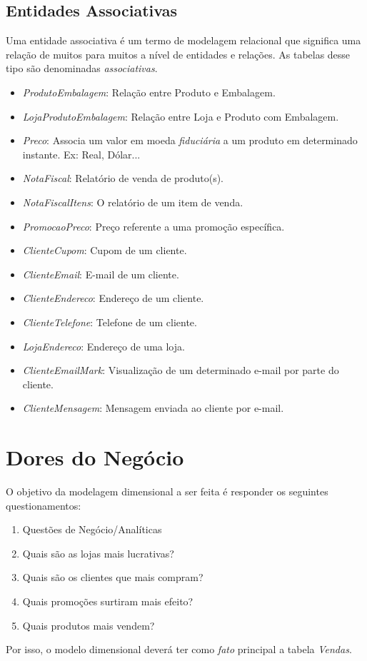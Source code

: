 \subsection{Entidades Associativas}

Uma entidade associativa é um termo de modelagem relacional que significa uma relação de muitos para muitos a nível de entidades e relações. As tabelas desse tipo são denominadas \emph{associativas}.

\begin{itemize}
\item \emph{ProdutoEmbalagem}: Relação entre Produto e Embalagem.
\item \emph{LojaProdutoEmbalagem}: Relação entre Loja e Produto com Embalagem.
\item \emph{Preco}: Associa um valor em moeda \emph{fiduciária} a um produto em determinado instante. Ex: Real, Dólar...
\item \emph{NotaFiscal}: Relatório de venda de produto(s).
\item \emph{NotaFiscalItens}: O relatório de um item de venda.
\item \emph{PromocaoPreco}: Preço referente a uma promoção específica.
\item \emph{ClienteCupom}: Cupom de um cliente.
\item \emph{ClienteEmail}: E-mail de um cliente.
\item \emph{ClienteEndereco}: Endereço de um  cliente.
\item \emph{ClienteTelefone}: Telefone de um cliente.
\item \emph{LojaEndereco}: Endereço de uma loja.
\item \emph{ClienteEmailMark}: Visualização de um determinado e-mail por parte do cliente.
\item \emph{ClienteMensagem}: Mensagem enviada ao cliente por e-mail.
\end{itemize}

\section{Dores do Negócio}

O objetivo da modelagem dimensional a ser feita é responder os seguintes questionamentos:

\begin{enumerate}
\item Questões de Negócio/Analíticas
\item Quais são as lojas mais lucrativas?
\item Quais são os clientes que mais compram?
\item Quais promoções surtiram mais efeito?
\item Quais produtos mais vendem?
\end{enumerate}

Por isso, o modelo dimensional deverá ter como \emph{fato} principal a tabela \emph{Vendas}.
